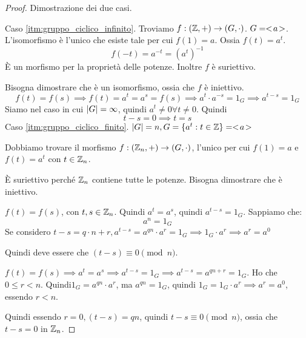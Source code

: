 \begin{proof}
Dimostrazione dei due casi.

Caso \ref{itm:gruppo_ciclico_infinito}. Troviamo $f : (\mathbb{Z}, +) \to (G, \cdot)$. $G = <\!{a}\!>$. L'isomorfismo \`e l'unico che esiste tale per cui $f(1) = a$. Ossia $f(t) = a^{t}$.
\[
f(-t) = a^{-t} = (a^t)^{-1}
\]
\`E un morfismo per la propriet\`a delle potenze. Inoltre $f$ \`e suriettivo.

Bisogna dimostrare che \`e un isomorfismo, ossia che $f$ \`e iniettivo.
\[
f(t) = f(s) \implies f(t) = a^t = a^s = f(s) \implies a^t \cdot a^{-s} = 1_G \implies a^{t - s} = 1_G 
\]
Siamo nel caso in cui $\left\lvert{G}\right\rvert = \infty$, quindi $a^t \neq 0 \forall t \neq 0$. Quindi
\[
t - s = 0 \implies t = s
\]
Caso \ref{itm:gruppo_ciclico_finito}. $\left\lvert{G}\right\rvert = n, G = \{a^t : t \in \mathbb{Z}\} = <\!{a}\!>$

Dobbiamo trovare il morfismo $f : (\mathbb{Z}_n, +) \to (G, \cdot)$, l'unico per cui $f(1) = a$ e $f(t) = a^t$ con $t \in \mathbb{Z}_n$.

\`E suriettivo perch\'e $\mathbb{Z}_n$ contiene tutte le potenze. Bisogna dimostrare che \`e iniettivo.

$f(t) = f(s)$, con $t, s \in \mathbb{Z}_n$. Quindi $a^t = a^s$, quindi $a^{t-s} = 1_G$. Sappiamo che:
\[
a^n = 1_G
\]
Se considero $t - s = q \cdot n + r, a^{t-s} = a^{qn} \cdot a^{r} = 1_G \implies 1_G \cdot a^{r} \implies a^r = a^0$

Quindi deve essere che $(t - s) \equiv 0 \pmod{n}$.

$f(t) = f(s) \implies a^t = a^s \implies a^{t-s} = 1_G \implies a^{t-s} = a^{qn + r} = 1_G$. Ho che $0 \le r < n$. Quindi$ 1_G = a^{qn} \cdot a^r$, ma $a^{qn} = 1_G$, quindi $1_G = 1_G \cdot a^r \implies a^r = a^0$, essendo $r < n$.

Quindi essendo $r = 0, (t - s) = qn$, quindi $t - s \equiv 0 \pmod{n}$, ossia che $t - s = 0$ in $\mathbb{Z}_n$.
\end{proof}


